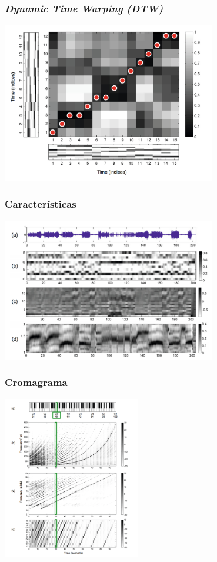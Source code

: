 \begin{frame}
  \frametitle{\emph{Dynamic Time Warping (DTW)}}
  \begin{center}
    \includegraphics[width=0.7\textwidth]{src/img/dtw.png}
  \end{center}
\end{frame}

\begin{frame}
  \frametitle{Características}
  \begin{center}
    \includegraphics[width=0.7\textwidth]{src/img/caracteristicas.png}
  \end{center}
\end{frame}

\begin{frame}
  \frametitle{Cromagrama}
  \begin{center}
    \includegraphics[width=0.45\textwidth]{src/img/cromagrama.png}
  \end{center}
\end{frame}

